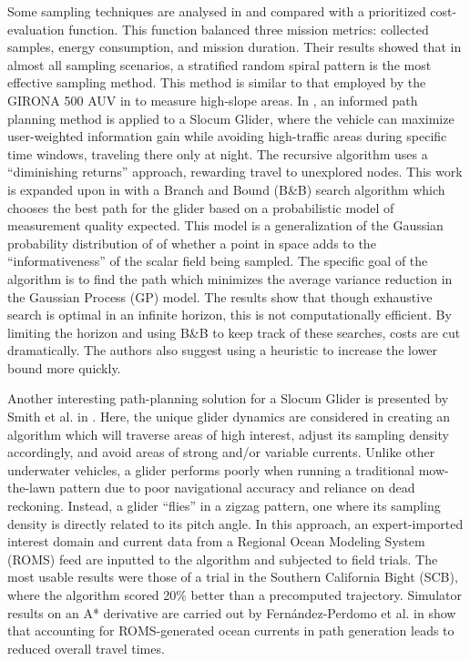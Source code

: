 \documentclass[double,12pt]{beavtex}
\begin{document}
Some sampling techniques are analysed in \cite{mora} and compared with a prioritized cost-evaluation function. This function balanced three mission metrics: collected samples, energy consumption, and mission duration. Their results showed that in almost all sampling scenarios, a stratified random spiral pattern is the most effective sampling method. This method is similar to that employed by the GIRONA 500 AUV in \cite{galceran} to measure high-slope areas. In \cite{binney}, an informed path planning method is applied to a Slocum Glider, where the vehicle can maximize user-weighted information gain while avoiding high-traffic areas during specific time windows, traveling there only at night. The recursive algorithm uses a “diminishing returns” approach, rewarding travel to unexplored nodes. This work is expanded upon in \cite{binneyB&B} with a Branch and Bound (B\&B) search algorithm which chooses the best path for the glider based on a probabilistic model of measurement quality expected. This model is a generalization of the Gaussian probability distribution of \cite{GP} of whether a point in space adds to the ``informativeness'' of the scalar field being sampled. The specific goal of the algorithm is to find the path which minimizes the average variance reduction in the Gaussian Process (GP) model. The results show that though exhaustive search is optimal in an infinite horizon, this is not computationally efficient. By limiting the horizon and using B\&B to keep track of these searches, costs are cut dramatically. The authors also suggest using a heuristic to increase the lower bound more quickly.

Another interesting path-planning solution for a Slocum Glider is presented by Smith et al. in \cite{smithglider}. Here, the unique glider dynamics are considered in creating an algorithm which will traverse areas of high interest, adjust its sampling density accordingly, and avoid areas of strong and/or variable currents. Unlike other underwater vehicles, a glider performs poorly when running a traditional mow-the-lawn pattern due to poor navigational accuracy and reliance on dead reckoning. Instead, a glider “flies” in a zigzag pattern, one where its sampling density is directly related to its pitch angle. In this approach, an expert-imported interest domain and current data from a Regional Ocean Modeling System (ROMS) feed are inputted to the algorithm and subjected to field trials. The most usable results were those of a trial in the Southern California Bight (SCB), where the algorithm scored 20\% better than a precomputed trajectory. Simulator results on an A* derivative are carried out by Fern\'{a}ndez-Perdomo et al. in \cite{fernandez} show that accounting for ROMS-generated ocean currents in path generation leads to reduced overall travel times.
\end{document}
